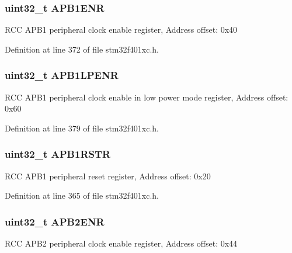 \subsubsection[{\texorpdfstring{A\+P\+B1\+E\+NR}{APB1ENR}}]{ uint32\+\_\+t A\+P\+B1\+E\+NR}\hypertarget{struct_r_c_c___type_def_ac88901e2eb35079b7b58a185e6bf554c}{}\label{struct_r_c_c___type_def_ac88901e2eb35079b7b58a185e6bf554c}
R\+CC A\+P\+B1 peripheral clock enable register, Address offset\+: 0x40 

Definition at line 372 of file stm32f401xc.\+h.

\subsubsection[{\texorpdfstring{A\+P\+B1\+L\+P\+E\+NR}{APB1LPENR}}]{ uint32\+\_\+t A\+P\+B1\+L\+P\+E\+NR}\hypertarget{struct_r_c_c___type_def_ad85a9951a7be79fe08ffc90f796f071b}{}\label{struct_r_c_c___type_def_ad85a9951a7be79fe08ffc90f796f071b}
R\+CC A\+P\+B1 peripheral clock enable in low power mode register, Address offset\+: 0x60 

Definition at line 379 of file stm32f401xc.\+h.

\subsubsection[{\texorpdfstring{A\+P\+B1\+R\+S\+TR}{APB1RSTR}}]{ uint32\+\_\+t A\+P\+B1\+R\+S\+TR}\hypertarget{struct_r_c_c___type_def_a7da5d372374bc59e9b9af750b01d6a78}{}\label{struct_r_c_c___type_def_a7da5d372374bc59e9b9af750b01d6a78}
R\+CC A\+P\+B1 peripheral reset register, Address offset\+: 0x20 

Definition at line 365 of file stm32f401xc.\+h.

\subsubsection[{\texorpdfstring{A\+P\+B2\+E\+NR}{APB2ENR}}]{ uint32\+\_\+t A\+P\+B2\+E\+NR}\hypertarget{struct_r_c_c___type_def_acc7bb47dddd2d94de124f74886d919be}{}\label{struct_r_c_c___type_def_acc7bb47dddd2d94de124f74886d919be}
R\+CC A\+P\+B2 peripheral clock enable register, Address offset\+: 0x44 

